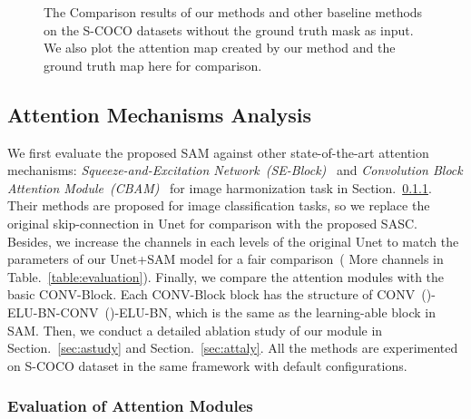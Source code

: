\begin{figure*}[h]
\caption{The Comparison results of our methods and other baseline methods on the S-COCO datasets without the ground truth mask as input. We also plot the attention map created by our method and the ground truth map here for comparison.}

\label{fig:unmask}
\vspace{-1.5em}
\end{figure*}

\subsection{Attention Mechanisms Analysis}
\label{sec:attention}
We first evaluate the proposed SAM against other state-of-the-art attention mechanisms: \textit{Squeeze-and-Excitation Network~(SE-Block)}~\cite{Hu:2017tf} and \textit{Convolution Block Attention Module~(CBAM)}~\cite{Woo:2018wr} for image harmonization task in Section.~\ref{sec:evaatt}. Their methods are proposed for image classification tasks, so we replace the original skip-connection in Unet for comparison with the proposed SASC. Besides, we increase the channels in each levels of the original Unet to match the parameters of our Unet+SAM model for a fair comparison~( More channels in Table.~\ref{table:evaluation}). Finally, we compare the attention modules with the basic CONV-Block. Each CONV-Block block has the structure of CONV~()-ELU-BN-CONV~()-ELU-BN, which is the same as the learning-able block in SAM. Then, we conduct a detailed ablation study of our module in Section.~\ref{sec:astudy} and Section.~\ref{sec:attaly}. All the methods are experimented on S-COCO dataset in the same framework with default configurations.



\subsubsection{Evaluation of Attention Modules}
\label{sec:evaatt}




